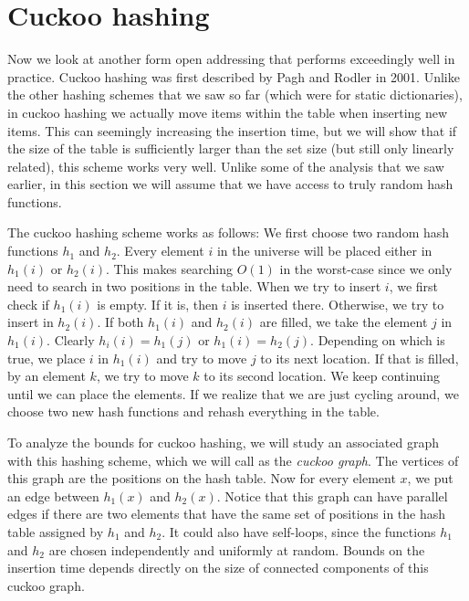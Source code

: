 \section{Cuckoo hashing}

Now we look at another form open addressing that performs exceedingly well in
practice. Cuckoo hashing was first described by Pagh and Rodler in 2001. Unlike
the other hashing schemes that we saw so far (which were for static
dictionaries), in cuckoo hashing we actually move items within the table when
inserting new items. This can seemingly increasing the insertion time, but we
will show that if the size of the table is sufficiently larger than the set size
(but still only linearly related), this scheme works very well.  Unlike some of the analysis that we
saw earlier, in this section we will assume that we have access to truly random
hash functions.

The cuckoo hashing scheme works as follows: We first choose two random hash
functions $h_1$ and $h_2$. Every element $i$ in the universe will be placed
either in $h_1(i)$ or $h_2(i)$. This makes searching $O(1)$ in the worst-case
since we only need to search in two positions in the table. When we try to
insert $i$, we first check if $h_1(i)$ is empty. If it is, then $i$ is inserted
there. Otherwise, we try to insert in $h_2(i)$. If both $h_1(i)$ and $h_2(i)$
are filled, we take the element $j$ in $h_1(i)$. Clearly $h_i(i) = h_1(j)$ or
$h_1(i) = h_2(j)$. Depending on which is true, we place $i$ in $h_1(i)$ and try
to move $j$ to its next location.  If that is filled, by an element $k$, we try
to move $k$ to its second location. We keep continuing until we can place the
elements. If we realize that we are just cycling around, we choose two new hash
functions and rehash everything in the table.

To analyze the bounds for cuckoo hashing, we will study an associated graph with
this hashing scheme, which we will call as the \emph{cuckoo graph}. The vertices
of this graph are the positions on the hash table. Now for every element $x$, we
put an edge between $h_1(x)$ and $h_2(x)$. Notice that this graph can have
parallel edges if there are two elements that have the same set of positions in
the hash table assigned by $h_1$ and $h_2$. It could also have self-loops, since
the functions $h_1$ and $h_2$ are chosen independently and uniformly at
random. Bounds on the insertion time depends directly on the size of connected
components of this cuckoo graph.

